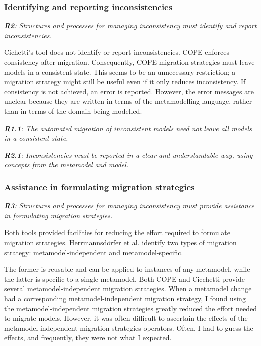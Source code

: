 \documentclass[a4paper]{article}
\begin{document}
\subsubsection{Identifying and reporting inconsistencies}

\emph{\textbf{R2}: Structures and processes for managing inconsistency must identify and report inconsistencies.}

Cichetti's tool does not identify or report inconsistencies. COPE enforces consistency after migration. Consequently, COPE migration strategies must leave models in a consistent state. This seems to be an unnecessary restriction; a migration strategy might still be useful even if it only reduces inconsistency. If consistency is not achieved, an error is reported. However, the error messages are unclear because they are written in terms of the metamodelling language, rather than in terms of the domain being modelled.

\emph{\textbf{R1.1}: The automated migration of inconsistent models need not leave all models in a consistent state.}

\emph{\textbf{R2.1}: Inconsistencies must be reported in a clear and understandable way, using concepts from the metamodel and model.}


\subsubsection{Assistance in formulating migration strategies}

\emph{\textbf{R3}: Structures and processes for managing inconsistency must provide assistance in formulating migration strategies.}

Both tools provided facilities for reducing the effort required to formulate migration strategies. Herrmannsd\"{o}rfer et al. identify two types of migration strategy: metamodel-independent and metamodel-specific.

The former is reusable and can be applied to instances of any metamodel, while the latter is specific to a single metamodel. Both COPE and Cicchetti provide several metamodel-independent migration strategies. When a metamodel change had a corresponding metamodel-independent migration strategy, I found using the metamodel-independent migration strategies greatly reduced the effort needed to migrate models. However, it was often difficult to ascertain the effects of the metamodel-independent migration strategies operators. Often, I had to guess the effects, and frequently, they were not what I expected.
\end{document}
